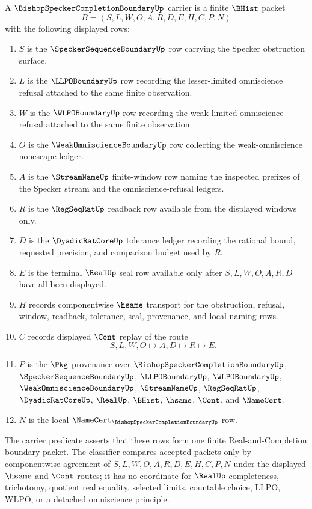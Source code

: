 \begin{definition}
\label{def:bishop-specker-completion-boundary-carrier}
A $\BishopSpeckerCompletionBoundaryUp$ carrier is a finite $\BHist$ packet
$$
B=(S,L,W,O,A,R,D,E,H,C,P,N)
$$
with the following displayed rows:
\begin{enumerate}
\item $S$ is the $\SpeckerSequenceBoundaryUp$ row carrying the Specker obstruction surface.
\item $L$ is the $\LLPOBoundaryUp$ row recording the lesser-limited omniscience refusal attached to the same finite observation.
\item $W$ is the $\WLPOBoundaryUp$ row recording the weak-limited omniscience refusal attached to the same finite observation.
\item $O$ is the $\WeakOmniscienceBoundaryUp$ row collecting the weak-omniscience nonescape ledger.
\item $A$ is the $\StreamNameUp$ finite-window row naming the inspected prefixes of the Specker stream and the omniscience-refusal ledgers.
\item $R$ is the $\RegSeqRatUp$ readback row available from the displayed windows only.
\item $D$ is the $\DyadicRatCoreUp$ tolerance ledger recording the rational bound, requested precision, and comparison budget used by $R$.
\item $E$ is the terminal $\RealUp$ seal row available only after $S,L,W,O,A,R,D$ have all been displayed.
\item $H$ records componentwise $\hsame$ transport for the obstruction, refusal, window, readback, tolerance, seal, provenance, and local naming rows.
\item $C$ records displayed $\Cont$ replay of the route
$$
S,L,W,O \longmapsto A,D \longmapsto R \longmapsto E .
$$
\item $P$ is the $\Pkg$ provenance over $\BishopSpeckerCompletionBoundaryUp$, $\SpeckerSequenceBoundaryUp$, $\LLPOBoundaryUp$, $\WLPOBoundaryUp$, $\WeakOmniscienceBoundaryUp$, $\StreamNameUp$, $\RegSeqRatUp$, $\DyadicRatCoreUp$, $\RealUp$, $\BHist$, $\hsame$, $\Cont$, and $\NameCert$.
\item $N$ is the local $\NameCert_{\BishopSpeckerCompletionBoundaryUp}$ row.
\end{enumerate}
The carrier predicate asserts that these rows form one finite Real-and-Completion boundary packet. The classifier compares accepted packets only by componentwise agreement of $S,L,W,O,A,R,D,E,H,C,P,N$ under the displayed $\hsame$ and $\Cont$ routes; it has no coordinate for $\RealUp$ completeness, trichotomy, quotient real equality, selected limits, countable choice, LLPO, WLPO, or a detached omniscience principle.
\end{definition}

